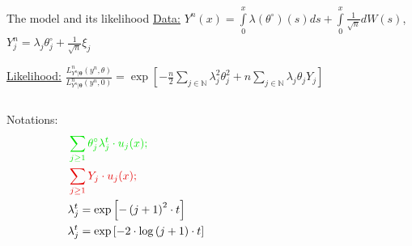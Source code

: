 \documentclass[10pt]{beamer}
\begin{document}
\begin{frame}{The model and its likelihood}
\underline{Data:} $Y^{n}(x) = \int\limits_{0}^{x} \lambda(\theta^{\circ})(s) ds + \int\limits_{0}^{x}\frac{1}{\sqrt{n}}dW(s)$, \quad $Y^{n}_{j} = \lambda_{j} \theta^{\circ}_{j} + \frac{1}{\sqrt{n}} \xi_{j}$

\underline{Likelihood:} $\frac{L_{Y^{n} \vert \boldsymbol{\theta}}^{n}(y^{n}, \theta)}{L_{Y^{n} \vert \boldsymbol{\theta}}^{n}(y^{n}, 0)} = \exp\left[-\frac{n}{2}\sum\limits_{j \in \mathbb{N}} \lambda_{j}^{2}\theta_{j}^{2} + n \sum\limits_{j \in \mathbb{N}}\lambda_{j} \theta_{j} Y_{j}\right]$

\begin{columns}
	\begin{column}[T]{.4\textwidth}%
		\bigskip
		\bigskip
		\begin{block}{Notations:}
			\begin{alignat*}{2}
				&\color{green!90!black} \sum\limits_{j \geq 1}\theta^{\circ}_{j} \lambda_{j}^{t} \cdot u_{j}(x);&&\\
				&\color{red!90!black} \sum\limits_{j \geq 1} Y_{j} \cdot u_{j}(x);&&\\
				&\lambda_{j}^{t} = \exp\left[-\left(j + 1\right)^{2} \cdot t \right]&&\\
				&\lambda_{j}^{t} = \exp\left[-2 \cdot \log\left(j + 1\right) \cdot t \right]&&
			\end{alignat*}
		\end{block}
	\end{column}
	\begin{column}[T]{.7\textwidth}%
		\begin{center}
		\end{center}
	\end{column}
\end{columns}
\end{frame}
\end{document}
